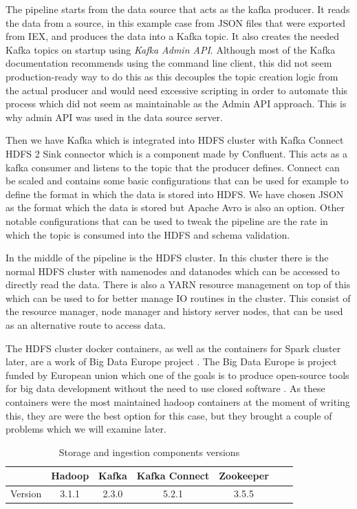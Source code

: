 The pipeline starts from the data source that acts as the kafka producer.
It reads the data from a source, in this example case from JSON files that were exported from IEX, and produces the data into a Kafka topic. 
It also creates the needed Kafka topics on startup using \emph{Kafka Admin API}.
Although most of the Kafka documentation recommends using the command line client, this did not seem production-ready way to do this as this decouples the topic creation logic from the actual producer and would need excessive scripting in order to automate this process which did not seem as maintainable as the Admin API approach.
This is why admin API was used in the data source server. 

Then we have Kafka which is integrated into HDFS cluster with Kafka Connect HDFS 2 Sink connector which is a component made by Confluent.
This acts as a kafka consumer and listens to the topic that the producer defines.
Connect can be scaled and contains some basic configurations that can be used for example to define the format in which the data is stored into HDFS.
We have chosen JSON as the format which the data is stored but Apache Avro is also an option.
Other notable configurations that can be used to tweak the pipeline are the rate in which the topic is consumed into the HDFS and schema validation.

In the middle of the pipeline is the HDFS cluster.
In this cluster there is the normal HDFS cluster with namenodes and datanodes which can be accessed to directly read the data.
There is also a YARN resource management on top of this which can be used to for better manage IO routines in the cluster.
This consist of the resource manager, node manager and history server nodes, that can be used as an alternative route to access data.

The HDFS cluster docker containers, as well as the containers for Spark cluster later, are a work of Big Data Europe project \cite{bde}.
The Big Data Europe is project funded by European union which one of the goals is to produce open-source tools for big data development without the need to use closed software \cite{bigdataeurope}.
As these containers were the most maintained hadoop containers at the moment of writing this, they are were the best option for this case, but they brought a couple of problems which we will examine later.

\begin{table}[! htbp]\centering
    \caption{Storage and ingestion components versions}
    \begin{threeparttable}
        \begin{tabular}{|c|c|c|c|c|c|c|} 
        \hline
        & Hadoop & Kafka & Kafka Connect & Zookeeper \\ \hline
        Version & 3.1.1 & 2.3.0 & 5.2.1 & 3.5.5\\
        \hline
        \end{tabular}
    \end{threeparttable}
\end{table}

